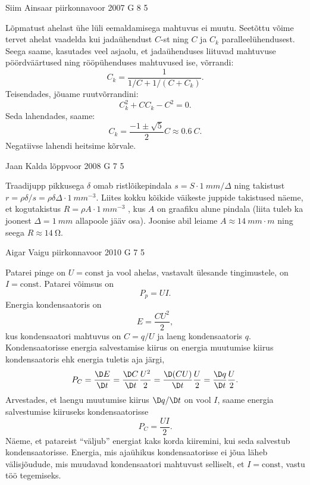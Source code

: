 \documentclass[11pt, twoside]{article}
\begin{document}
{%
{Siim Ainsaar} %
{piirkonnavoor} %
{2007} %
{G 8} %
{5} %
{

\ifSolution
Lõpmatust ahelast ühe lüli eemaldamisega mahtuvus ei muutu. Seetõttu võime tervet ahelat vaadelda kui jadaühendust $C$-st ning $C$ ja $C_k$ paralleelühendusest. Seega saame, kasutades veel asjaolu, et jadaühenduses liituvad mahtuvuse pöördväärtused ning rööpühenduses mahtuvused ise, võrrandi:
\[
C_{k}=\frac{1}{1 / C+1 /\left(C+C_{k}\right)}.
\]
Teisendades, jõuame ruutvõrrandini:
\[
C_{k}^{2}+C C_{k}-C^{2}=0.
\]
Seda lahendades, saame:
\[
C_{k}=\frac{-1 \pm \sqrt{5}}{2} C \approx \SI{0,6}{C}.
\]
Negatiivse lahendi heitsime kõrvale.
\fi
}

{Jaan Kalda} %
{lõppvoor} %
{2008} %
{G 7} %
{5} %
{

\ifSolution
Traadijupp pikkusega $\delta$ omab ristlõikepindala $s = S \cdot \SI{1}{mm}/\Delta$ ning takistust $r = \rho \delta /s = \rho \delta \Delta \cdot \SI{1}{mm^{-3}}$. Liites kokku kõikide väikeste juppide takistused näeme, et kogutakistus $R = \rho A \cdot \SI{1}{mm^{-3}}$ , kus $A$ on graafiku alune pindala (liita tuleb ka joonest $\Delta = \SI{1}{mm}$ allapoole jääv osa). Joonise abil leiame $A \approx \SI{14}{mm\cdot m}$ ning seega $R \approx \SI{14}{\ohm}$. 
\fi
}

{Aigar Vaigu} %
{piirkonnavoor} %
{2010} %
{G 7} %
{5} %
{

\ifSolution
Patarei pinge on $U=\text{const}$ ja vool ahelas, vastavalt ülesande tingimustele, on $I=\text{const}$. Patarei võimsus on
\[P_p=UI. \]
Energia kondensaatoris on
\[E=\frac{CU^2}{2}, \]
kus kondensaatori mahtuvus on $C=q/U$ ja laeng kondensaatoris $q$.
Kondensaatorisse energia salvestamise kiirus on energia muutumise kiirus kondensaatoris ehk energia tuletis aja järgi,
\[P_C=\frac{\D E}{\D t}=\frac{\D C}{\D t}\frac{U^2}{2}=\frac{\D (CU)}{\D t}\frac{U}{2}=\frac{\D q}{\D t}\frac{U}{2}.\]
Arvestades, et laengu muutumise kiirus $\D q/\D t$ on vool $I$, saame energia salvestumise kiiruseks kondensaatorisse
\[P_C=\frac{UI}{2}.\]
Näeme, et patareist \enquote{väljub} energiat kaks korda kiiremini, kui seda salvestub kondensaatorisse. Energia, mis ajaühikus kondensaatorisse ei jõua läheb välisjõudude, mis muudavad kondensaatori mahtuvust selliselt, et $I=\text{const}$, vastu töö tegemiseks.
\fi
}

}
\end{document}
